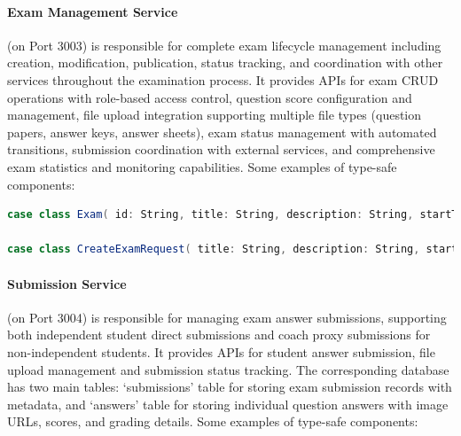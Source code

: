 \documentclass[12pt]{article}
\begin{document}
\paragraph{Exam Management Service} (on Port 3003) is responsible for complete exam lifecycle management including creation, modification, publication, status tracking, and coordination with other services throughout the examination process. It provides APIs for exam CRUD operations with role-based access control, question score configuration and management, file upload integration supporting multiple file types (question papers, answer keys, answer sheets), exam status management with automated transitions, submission coordination with external services, and comprehensive exam statistics and monitoring capabilities. Some examples of type-safe components:

\begin{lstlisting}[language=Scala]
case class Exam( id: String, title: String, description: String, startTime: LocalDateTime, endTime: LocalDateTime, status: ExamStatus, createdAt: LocalDateTime, updatedAt: LocalDateTime, duration: Option[Int] = None, questionFile: Option[ExamFile] = None, answerFile: Option[ExamFile] = None, answerSheetFile: Option[ExamFile] = None, createdBy: String, participants: List[String] = List.empty, totalQuestions: Option[Int] = None, maxScore: Option[Double] = None, totalScore: Option[Double] = None, subject: Option[String] = None, instructions: Option[String] = None )

case class CreateExamRequest( title: String, description: String, startTime: LocalDateTime, endTime: LocalDateTime, totalQuestions: Int, duration: Int, status: ExamStatus = ExamStatus.Draft, totalScore: Option[Double] = None, questions: Option[List[CreateExamQuestionRequest]] = None )
\end{lstlisting}

\paragraph{Submission Service} (on Port 3004) is responsible for managing exam answer submissions, supporting both independent student direct submissions and coach proxy submissions for non-independent students. It provides APIs for student answer submission, file upload management and submission status tracking. The corresponding database has two main tables: `submissions' table for storing exam submission records with metadata, and `answers' table for storing individual question answers with image URLs, scores, and grading details. Some examples of type-safe components:
\end{document}
